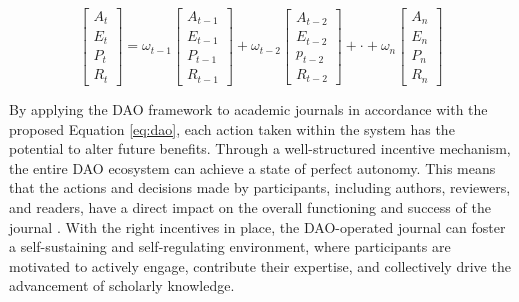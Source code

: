 \documentclass[lettersize,journal]{IEEEtran}
\begin{document}
\begin{equation}
  \begin{bmatrix}
    A_t \\
    E_t \\
    P_t \\
    R_t 
  \end{bmatrix}
  = 
  \omega_{t-1}
  \begin{bmatrix}
    A_{t-1} \\
    E_{t-1} \\
    P_{t-1} \\
    R_{t-1}
  \end{bmatrix}
  +
  \omega_{t-2}
  \begin{bmatrix}
    A_{t-2} \\
    E_{t-2} \\
    p_{t-2} \\
    R_{t-2}
  \end{bmatrix}
  +
  \cdot
  + 
  \omega_n
  \begin{bmatrix}
    A_n \\
    E_n \\
    P_n \\
    R_n
  \end{bmatrix}
  \label{eq:dao}
\end{equation}



By applying the DAO framework to academic journals in accordance with the proposed Equation \ref{eq:dao}, each action taken within the system has the potential to alter future benefits. Through a well-structured incentive mechanism, the entire DAO ecosystem can achieve a state of perfect autonomy. This means that the actions and decisions made by participants, including authors, reviewers, and readers, have a direct impact on the overall functioning and success of the journal \cite{10426804}. With the right incentives in place, the DAO-operated journal can foster a self-sustaining and self-regulating environment, where participants are motivated to actively engage, contribute their expertise, and collectively drive the advancement of scholarly knowledge.
\end{document}
